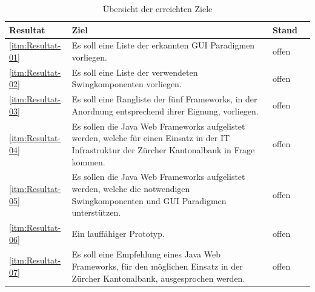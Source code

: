   \begin{table}[ht]
    \begin{center}
      \begin{tabular}{lp{9cm}ll}
        \toprule
        Resultat & Ziel & Stand \\
        \midrule
        \ref{itm:Resultat-01} &
          Es soll eine Liste der erkannten GUI Paradigmen vorliegen. &
          offen\\
        \ref{itm:Resultat-02} &
          Es soll eine Liste der verwendeten Swingkomponenten vorliegen. &
          offen\\
        \ref{itm:Resultat-03} &
          Es soll eine Rangliste der fünf Frameworks, in der Anordnung
          entsprechend ihrer Eignung, vorliegen. &
          offen\\
        \ref{itm:Resultat-04} &
          Es sollen die Java Web Frameworks aufgelistet werden, welche für
          einen Einsatz in der IT Infrastruktur der Zürcher Kantonalbank in
          Frage kommen. &
          offen\\
        \ref{itm:Resultat-05} &
          Es sollen die Java Web Frameworks aufgelistet werden, welche die
          notwendigen Swingkomponenten und GUI Paradigmen unterstützen. &
          offen\\
        \ref{itm:Resultat-06} &
          Ein lauffähiger Prototyp. &
          offen\\
        \ref{itm:Resultat-07} &
          Es soll eine Empfehlung eines Java Web Frameworks, für den möglichen
          Einsatz in der Zürcher Kantonalbank, ausgesprochen werden. &
          offen\\
        \bottomrule
      \end{tabular}
      \caption{Übersicht der erreichten Ziele}
      \label{tab:erreichteZiele}
    \end{center}
  \end{table}